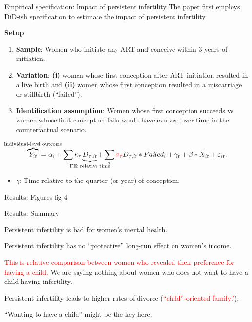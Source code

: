 \documentclass[notes,11pt, aspectratio=169]{beamer}
\newenvironment{wideitemize}{\itemize\addtolength{\itemsep}{0.4em}}{\enditemize}
\begin{document}
\begin{frame}{Empirical specification: Impact of persistent infertility}
	\vspace{1em}
	The paper first employs DiD-ish specification to estimate the impact of persistent infertility.
	\vspace{1em}
	\begin{block}{\textbf{Setup}}
		\begin{enumerate}
			\item \textbf{Sample}: Women who initiate any ART and conceive within 3 years of initiation.
			\item \textbf{Variation}: \textbf{(i)} women whose first conception after ART initiation resulted in a live birth and \textbf{(ii)} women whose first conception resulted in a miscarriage or stillbirth (``failed'').
			\item \textbf{Identification assumption}: Women whose first conception succeeds vs women whose first conception fails would have evolved over time in the counterfactual scenario.
		\end{enumerate}	
	\end{block}
	\begin{align*}
		\overbrace{Y_{it}}^{\hidewidth \text{Individual-level outcome} \hidewidth} = \alpha_i + \sum_{\tau} \kappa_{\tau} \underbrace{D_{\tau, it}}_{\hidewidth \text{FE: relative time} \hidewidth} + \sum_{\tau} \textcolor{red}{\sigma_{\tau}} D_{\tau,it} * Failed_i + \gamma_t + \beta * X_{it} + \varepsilon_{it}.
	\end{align*}

	\begin{itemize}
		\item $\gamma$: Time relative to the quarter (or year) of conception.
	\end{itemize}
\end{frame}

\begin{frame}{Results: Figures}
fig 4

\end{frame}

\begin{frame}{Results: Summary}
\begin{wideitemize}
	\item Persistent infertility is bad for women's mental health.
	\item Persistent infertility has no ``protective'' long-run effect on women's income.
	\item \textcolor{red}{This is relative comparison between women who revealed their preference for having a child.} We are saying nothing about women who does not want to have a child having infertility.
	\item Persistent infertility leads to higher rates of divorce (\textcolor{red}{``child''-oriented family?}).
	\item ``Wanting to have a child'' might be the key here.

\end{wideitemize}	
\end{frame}
\end{document}
